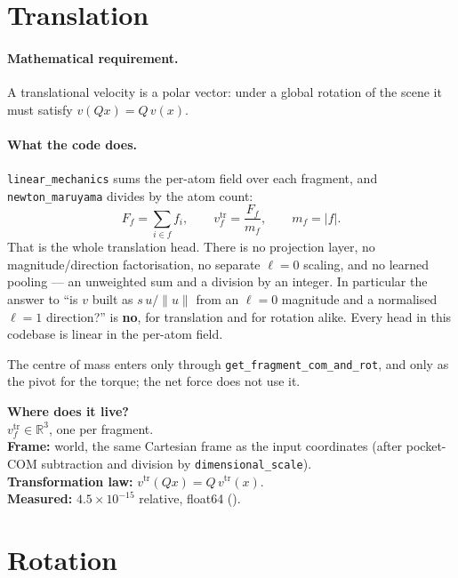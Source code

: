 \documentclass[11pt,a4paper]{report}
\theoremstyle{definition}
\theoremstyle{remark}
\newcommand{\RR}{\mathbb R}
\newcommand{\pyfunc}[1]{\texttt{#1}}
\begin{document}
\section{Translation}
\label{sec:head-translation}

\paragraph{Mathematical requirement.} A translational velocity is a polar
vector: under a global rotation of the scene it must satisfy
$v(Qx)=Q\,v(x)$.

\paragraph{What the code does.} \pyfunc{linear\_mechanics} sums the per-atom
field over each fragment, and \pyfunc{newton\_maruyama} divides by the atom
count:
\[
F_f=\sum_{i\in f}f_i,
\qquad
v_f^{\mathrm{tr}}=\frac{F_f}{m_f},\qquad m_f=|f| .
\]
That is the whole translation head. There is no projection layer, no
magnitude/direction factorisation, no separate $\ell=0$ scaling, and no
learned pooling --- an unweighted sum and a division by an integer. In
particular the answer to ``is $v$ built as $s\,u/\|u\|$ from an $\ell=0$
magnitude and a normalised $\ell=1$ direction?'' is \textbf{no}, for
translation and for rotation alike. Every head in this codebase is linear in
the per-atom field.

The centre of mass enters only through \pyfunc{get\_fragment\_com\_and\_rot},
and only as the pivot for the torque; the net force does not use it.

\begin{codebox}
\textbf{Where does it live?} \\
$v^{\mathrm{tr}}_f\in\RR^3$, one per fragment. \\
\textbf{Frame:} world, the same Cartesian frame as the input coordinates
(after pocket-COM subtraction and division by
\texttt{dimensional\_scale}). \\
\textbf{Transformation law:} $v^{\mathrm{tr}}(Qx)=Q\,v^{\mathrm{tr}}(x)$. \\
\textbf{Measured:} $4.5\times10^{-15}$ relative, float64
().
\end{codebox}

\section{Rotation}
\label{sec:head-rotation}
\end{document}
